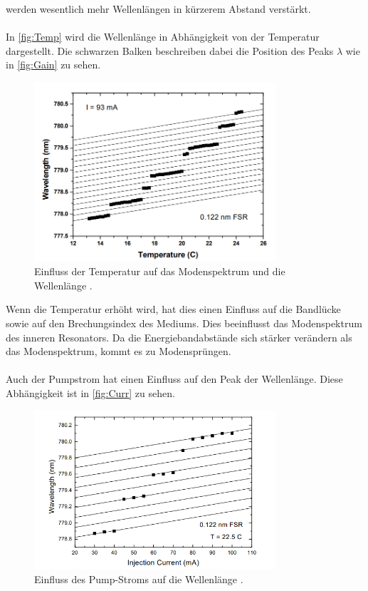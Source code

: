 werden wesentlich mehr Wellenlängen in kürzerem Abstand verstärkt. 
\\
\\
In \autoref{fig:Temp} wird die Wellenlänge in Abhängigkeit von der Temperatur dargestellt. 
Die schwarzen Balken beschreiben dabei die Position des Peaks $\lambda$ wie in \autoref{fig:Gain} 
zu sehen. 
\begin{figure}
    \centering
    \includegraphics[width=0.8\textwidth]{ModeTemp.png}
    \caption{Einfluss der Temperatur auf das Modenspektrum und die Wellenlänge \cite{ap60}.}
    \label{fig:Temp}
\end{figure}
Wenn die Temperatur erhöht wird, hat dies einen Einfluss auf die Bandlücke sowie auf den Brechungsindex des 
Mediums. Dies beeinflusst das Modenspektrum des inneren Resonators. Da die Energiebandabstände sich stärker verändern 
als das Modenspektrum, kommt es zu Modensprüngen.
\\
\\
Auch der Pumpstrom hat einen Einfluss auf den Peak der Wellenlänge. Diese Abhängigkeit ist in \autoref{fig:Curr}
zu sehen.
\begin{figure}
    \centering
    \includegraphics[width=0.8\textwidth]{ModeCurr.png}
    \caption{Einfluss des Pump-Stroms auf die Wellenlänge \cite{ap60}.}
    \label{fig:Curr}
\end{figure}
